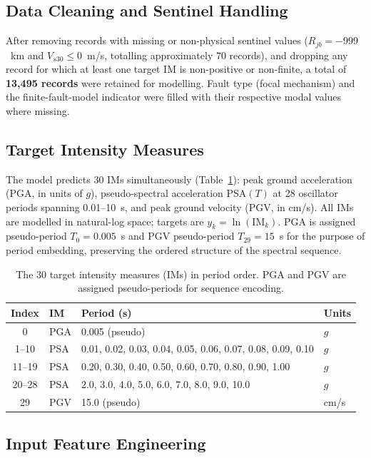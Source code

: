 \documentclass[12pt,a4paper]{article}
\begin{document}
\subsection{Data Cleaning and Sentinel Handling}

After removing records with missing or non-physical sentinel values
($R_{jb} = -999$~km and $V_{s30} \le 0$~m/s, totalling approximately 70
records), and dropping any record for which at least one target IM is
non-positive or non-finite, a total of \textbf{13{,}495 records} were
retained for modelling.
Fault type (focal mechanism) and the finite-fault-model indicator were filled
with their respective modal values where missing.

\subsection{Target Intensity Measures}

The model predicts 30 IMs simultaneously (Table~\ref{tab:IMs}):
peak ground acceleration (PGA, in units of $g$), pseudo-spectral acceleration
PSA$(T)$ at 28 oscillator periods spanning 0.01--10~s, and peak ground
velocity (PGV, in cm/s).
All IMs are modelled in natural-log space; targets are
$y_k = \ln(\text{IM}_k)$.
PGA is assigned pseudo-period $T_0 = 0.005$~s and PGV pseudo-period
$T_{29} = 15$~s for the purpose of period embedding, preserving the ordered
structure of the spectral sequence.

\begin{table}[htbp]
\centering
\caption{The 30 target intensity measures (IMs) in period order.
PGA and PGV are assigned pseudo-periods for sequence encoding.}
\label{tab:IMs}
\footnotesize
\renewcommand{\arraystretch}{1.15}
\begin{tabular}{clll}
\toprule
Index & IM & Period (s) & Units \\
\midrule
0  & PGA & 0.005 (pseudo) & $g$ \\
1--10 & PSA & 0.01, 0.02, 0.03, 0.04, 0.05, 0.06, 0.07, 0.08, 0.09, 0.10 & $g$ \\
11--19 & PSA & 0.20, 0.30, 0.40, 0.50, 0.60, 0.70, 0.80, 0.90, 1.00 & $g$ \\
20--28 & PSA & 2.0, 3.0, 4.0, 5.0, 6.0, 7.0, 8.0, 9.0, 10.0 & $g$ \\
29 & PGV & 15.0 (pseudo) & cm/s \\
\bottomrule
\end{tabular}
\end{table}

\subsection{Input Feature Engineering}
\label{sec:features}
\end{document}

